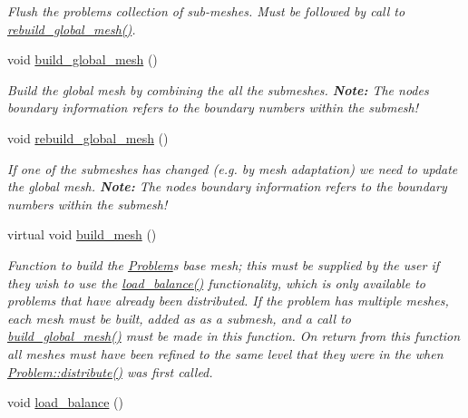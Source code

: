 \begin{DoxyCompactItemize}
\begin{DoxyCompactList}\small\item\em Flush the problem\textquotesingle{}s collection of sub-\/meshes. Must be followed by call to \hyperlink{classoomph_1_1Problem_ac0a0e649f36b4a7ce992888c323d1571}{rebuild\+\_\+global\+\_\+mesh()}. \end{DoxyCompactList}\item 
void \hyperlink{classoomph_1_1Problem_a0faad6f705a6dc0ffe27229f9104ed7c}{build\+\_\+global\+\_\+mesh} ()
\begin{DoxyCompactList}\small\item\em Build the global mesh by combining the all the submeshes. {\bfseries Note\+:} The nodes boundary information refers to the boundary numbers within the submesh! \end{DoxyCompactList}\item 
void \hyperlink{classoomph_1_1Problem_ac0a0e649f36b4a7ce992888c323d1571}{rebuild\+\_\+global\+\_\+mesh} ()
\begin{DoxyCompactList}\small\item\em If one of the submeshes has changed (e.\+g. by mesh adaptation) we need to update the global mesh. {\bfseries Note\+:} The nodes boundary information refers to the boundary numbers within the submesh! \end{DoxyCompactList}\item 
virtual void \hyperlink{classoomph_1_1Problem_a220816aebf8c74c6c524088e3da4d793}{build\+\_\+mesh} ()
\begin{DoxyCompactList}\small\item\em Function to build the \hyperlink{classoomph_1_1Problem}{Problem}\textquotesingle{}s base mesh; this must be supplied by the user if they wish to use the \hyperlink{classoomph_1_1Problem_ad6309367fa379889012f25e3397ab425}{load\+\_\+balance()} functionality, which is only available to problems that have already been distributed. If the problem has multiple meshes, each mesh must be built, added as as a submesh, and a call to \hyperlink{classoomph_1_1Problem_a0faad6f705a6dc0ffe27229f9104ed7c}{build\+\_\+global\+\_\+mesh()} must be made in this function. On return from this function all meshes must have been refined to the same level that they were in the when \hyperlink{classoomph_1_1Problem_aa35e1adc0fdf14b217c7b608eb9cf20b}{Problem\+::distribute()} was first called. \end{DoxyCompactList}\item 
void \hyperlink{classoomph_1_1Problem_ad6309367fa379889012f25e3397ab425}{load\+\_\+balance} ()

\end{DoxyCompactItemize}
